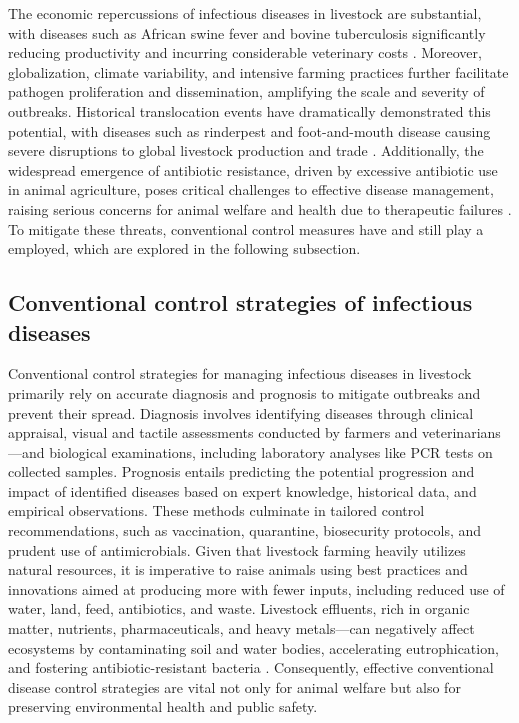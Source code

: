 The economic repercussions of infectious diseases in livestock are substantial, with diseases such as African swine fever and bovine tuberculosis significantly reducing productivity and incurring considerable veterinary costs \cite{gilbert2024quantifying}. Moreover, globalization, climate variability, and intensive farming practices further facilitate pathogen proliferation and dissemination, amplifying the scale and severity of outbreaks. Historical translocation events have dramatically demonstrated this potential, with diseases such as rinderpest and foot-and-mouth disease causing severe disruptions to global livestock production and trade \cite{GUMMOW201041}. Additionally, the widespread emergence of antibiotic resistance, driven by excessive antibiotic use in animal agriculture, poses critical challenges to effective disease management, raising serious concerns for animal welfare and health due to therapeutic failures \cite{bengtsson2014antibiotic}. To mitigate these threats, conventional control measures have and still play a employed, which are explored in the following subsection.


\subsection{Conventional control strategies of infectious diseases}
\label{Conventional control strategies} %

Conventional control strategies for managing infectious diseases in livestock primarily rely on accurate diagnosis and prognosis to mitigate outbreaks and prevent their spread. Diagnosis involves identifying diseases through clinical appraisal, visual and tactile assessments conducted by farmers and veterinarians—and biological examinations, including laboratory analyses like PCR tests on collected samples. Prognosis entails predicting the potential progression and impact of identified diseases based on expert knowledge, historical data, and empirical observations. These methods culminate in tailored control recommendations, such as vaccination, quarantine, biosecurity protocols, and prudent use of antimicrobials. Given that livestock farming heavily utilizes natural resources, it is imperative to raise animals using best practices and innovations aimed at producing more with fewer inputs, including reduced use of water, land, feed, antibiotics, and waste. Livestock effluents, rich in organic matter, nutrients, pharmaceuticals, and heavy metals—can negatively affect ecosystems by contaminating soil and water bodies, accelerating eutrophication, and fostering antibiotic-resistant bacteria \cite{almeida2017veterinary, girard2014review, hooda2000review, martinez2009livestock}. Consequently, effective conventional disease control strategies are vital not only for animal welfare but also for preserving environmental health and public safety.

